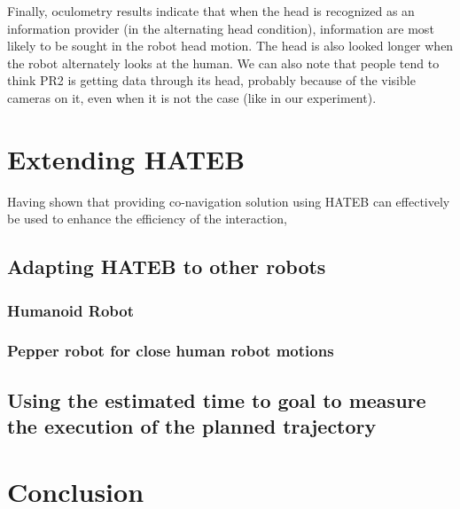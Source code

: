 \documentclass[a4paper,11pt,twoside]{StyleThese}
\begin{document}
Finally, oculometry results indicate that when the head is recognized as an information provider (in the alternating head condition), information are most likely to be sought in the robot head motion. The head is also looked longer when the robot alternately looks at the human. We can also note that people tend to think PR2 is getting data through its head, probably because of the visible cameras on it, even when it is not the case (like in our experiment).


\section{Extending HATEB}
Having shown that providing co-navigation solution using HATEB can effectively be used to enhance the efficiency of the interaction, 

\subsection{Adapting HATEB to other robots}
\subsubsection{Humanoid Robot}

\subsubsection{Pepper robot for close human robot motions}

\subsection{Using the estimated time to goal to measure the execution of the planned trajectory}


\section{Conclusion}

\ifdefined{}
\else


\end{document}
